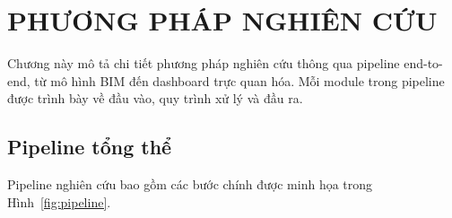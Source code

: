 
\chapter{PHƯƠNG PHÁP NGHIÊN CỨU}
\label{chap:phuongphap}

Chương này mô tả chi tiết phương pháp nghiên cứu thông qua pipeline end-to-end, từ mô hình BIM đến dashboard trực quan hóa. Mỗi module trong pipeline được trình bày về đầu vào, quy trình xử lý và đầu ra.

\section{Pipeline tổng thể}
\label{sec:pipeline}

Pipeline nghiên cứu bao gồm các bước chính được minh họa trong Hình~\ref{fig:pipeline}.

